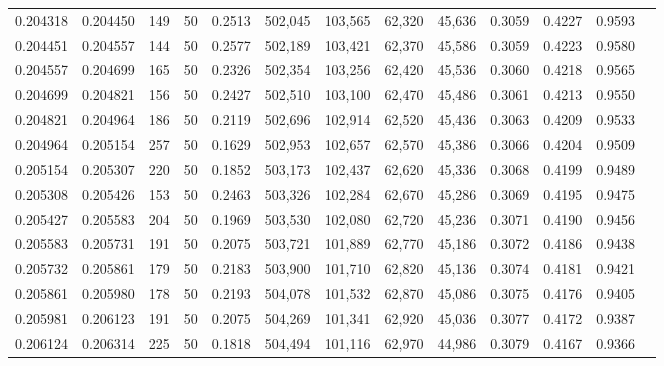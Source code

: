 \begin{tabular}{rrrrrrrrrrrrr}
0.204318 & 0.204450 &   149 &  50 &                                     0.2513 & 502,045 & 103,565 &  62,320 &  45,636 & 0.3059 & 0.4227 & 0.9593 \\
0.204451 & 0.204557 &   144 &  50 &                                     0.2577 & 502,189 & 103,421 &  62,370 &  45,586 & 0.3059 & 0.4223 & 0.9580 \\
0.204557 & 0.204699 &   165 &  50 &                                     0.2326 & 502,354 & 103,256 &  62,420 &  45,536 & 0.3060 & 0.4218 & 0.9565 \\
0.204699 & 0.204821 &   156 &  50 &                                     0.2427 & 502,510 & 103,100 &  62,470 &  45,486 & 0.3061 & 0.4213 & 0.9550 \\
0.204821 & 0.204964 &   186 &  50 &                                     0.2119 & 502,696 & 102,914 &  62,520 &  45,436 & 0.3063 & 0.4209 & 0.9533 \\
0.204964 & 0.205154 &   257 &  50 &                                     0.1629 & 502,953 & 102,657 &  62,570 &  45,386 & 0.3066 & 0.4204 & 0.9509 \\
0.205154 & 0.205307 &   220 &  50 &                                     0.1852 & 503,173 & 102,437 &  62,620 &  45,336 & 0.3068 & 0.4199 & 0.9489 \\
0.205308 & 0.205426 &   153 &  50 &                                     0.2463 & 503,326 & 102,284 &  62,670 &  45,286 & 0.3069 & 0.4195 & 0.9475 \\
0.205427 & 0.205583 &   204 &  50 &                                     0.1969 & 503,530 & 102,080 &  62,720 &  45,236 & 0.3071 & 0.4190 & 0.9456 \\
0.205583 & 0.205731 &   191 &  50 &                                     0.2075 & 503,721 & 101,889 &  62,770 &  45,186 & 0.3072 & 0.4186 & 0.9438 \\
0.205732 & 0.205861 &   179 &  50 &                                     0.2183 & 503,900 & 101,710 &  62,820 &  45,136 & 0.3074 & 0.4181 & 0.9421 \\
0.205861 & 0.205980 &   178 &  50 &                                     0.2193 & 504,078 & 101,532 &  62,870 &  45,086 & 0.3075 & 0.4176 & 0.9405 \\
0.205981 & 0.206123 &   191 &  50 &                                     0.2075 & 504,269 & 101,341 &  62,920 &  45,036 & 0.3077 & 0.4172 & 0.9387 \\
0.206124 & 0.206314 &   225 &  50 &                                     0.1818 & 504,494 & 101,116 &  62,970 &  44,986 & 0.3079 & 0.4167 & 0.9366 \\

\end{tabular}
